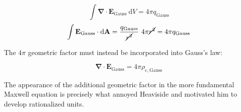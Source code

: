 \documentclass[notoc]{tufte-handout}
\renewcommand{\vec}[1]{
\mathbf{#1}
}
\begin{document}
\[
\int \vec{\nabla} \cdot \vec{E}_{\text{Gauss}}~\mathrm{d}V = 4\pi q_{\text{Gauss}}
\]
\[
\int \vec{E}_{\text{Gauss}} \cdot \mathrm{d}\vec{A} =  \frac{q_{\text{Gauss}}}{\cancel{r^2}}~4\pi\cancel{r^2} = 4\pi q_{\text{Gauss}}
\]


The $4\pi$ geometric factor must instead be incorporated into Gauss's law:

\[
\vec{\nabla} \cdot \vec{E}_{\text{Gauss}} = 4\pi \rho_{e, \text{Gauss}}
\]

The appearance of the additional geometric factor in the more fundamental Maxwell equation is precisely what annoyed Heaviside and motivated him to develop rationalized units.











\end{document}
